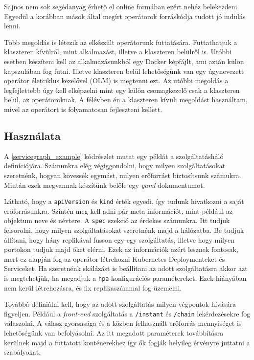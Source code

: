 Sajnos nem sok segédanyag érhető el online formában ezért nehéz belekezdeni. Egyedül a korábban mások által megírt operátorok forráskódja tudott jó indulás lenni.

Több megoldás is létezik az elkészült operátorunk futtatására. Futtathatjuk a klaszteren kívülről, mint alkalmazást, illetve a klaszteren belülről is. Utóbbi esetben készíteni kell az alkalmazásunkból egy Docker képfájlt, ami aztán külön kapszulában fog futni. Illetve klaszteren belül lehetőségünk van egy úgynevezett operátor életciklus kezelővel (OLM) is megtenni ezt. Az utóbbi megoldás a legfejlettebb úgy kell elképzelni mint egy külön csomagkezelő csak a klaszteren belül, az operátoroknak. A félévben én a klaszteren kívüli megoldást használtam, mivel az operátort is folyamatosan fejleszteni kellett. 

\subsection{Használata}
A \ref{servicegraph_example} kódrészlet mutat egy példát a szolgáltatásháló definíciójára. Számunkra elég végiggondolni, hogy milyen szolgáltatásokat szeretnénk, hogyan kövessék egymást, milyen erőforrást biztosítsunk számukra. Miután ezek megvannak készítünk belőle egy \textit{yaml} dokumentumot.

Látható, hogy a \verb+apiVersion+ és \verb+kind+ érték egyedi, így tudunk hivatkozni a saját erőforrásunkra. Szintén meg kell adni pár meta információt, mint például az objektum neve és névtere. A \verb+spec+ szekció az érdekes számunkra. Itt tudjuk felsorolni, hogy milyen szolgáltatásokat szeretnénk majd a hálózatba. Be tudjuk állítani, hogy hány replikával fusson egy-egy szolgáltatás, illetve hogy milyen portokon tudjuk majd őket elérni. Ezek az információk azért lesznek fontosak, mert ez alapján fog az operátor létrehozni Kubernetes Deploymenteket és Serviceket. Ha szeretnénk skálázást is beállítani az adott szolgáltatásra akkor azt is megtehetjük, ha megadjuk a \verb+hpa+ konfigurációs paramétereket. Ezek hiányában nem kerül létrehozásra, és fix replikaszámmal fog üzemelni.

Továbbá definiálni kell, hogy az adott szolgáltatás milyen végpontok hívására figyeljen. Például a \textit{front-end} szolgáltatás a \verb+/instant+ és \verb+/chain+ lekérdezésekre fog válaszolni. A válasz gyorsasága és a közben felhasznált erőforrás mennyiséget is lehetőségünk van befolyásolni. Az itt megadott paraméterek továbbításra kerülnek majd a futtatott konténerekhez így ők fogják helyileg érvényre juttatni a szabályokat. 


